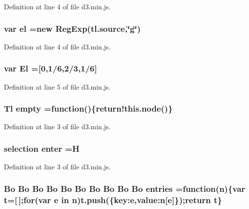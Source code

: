 Definition at line 4 of file d3.\+min.\+js.

\subsubsection[{el}]{\setlength{\rightskip}{0pt plus 5cm}var el =new Reg\+Exp(tl.\+source,\char`\"{}g\char`\"{})}\label{d3_8min_8js_ab86cf0f3b9a0d6ca6e9629d1d6d13323}


Definition at line 4 of file d3.\+min.\+js.

\subsubsection[{El}]{\setlength{\rightskip}{0pt plus 5cm}var El =[0,1/6,2/3,1/6]}\label{d3_8min_8js_afac334e472ed6588e739a18ed390ad77}


Definition at line 5 of file d3.\+min.\+js.

\subsubsection[{empty}]{ {\bf Tl} empty =function()\{{\bf return!this.\+node}()\}}\label{d3_8min_8js_a2e0d863a234671c905aa5137017cee5c}


Definition at line 3 of file d3.\+min.\+js.

\subsubsection[{enter}]{ {\bf selection} enter =H}\label{d3_8min_8js_a4c7a92e6fa56d929d52dd6d8768e22c8}


Definition at line 3 of file d3.\+min.\+js.

\subsubsection[{entries}]{ {\bf Bo} {\bf Bo} {\bf Bo} {\bf Bo} {\bf Bo} {\bf Bo} {\bf Bo} {\bf Bo} {\bf Bo} {\bf Bo} entries =function({\bf n})\{var t=[$\,$];{\bf for}(var {\bf e} in {\bf n})t.\+push(\{key\+:e,value\+:n[{\bf e}]\});{\bf return} t\}}\label{d3_8min_8js_a6283cfb812d261d235e4d7876d0c7129}


